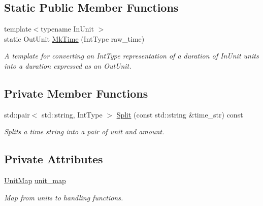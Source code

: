 \subsection*{Static Public Member Functions}
\begin{DoxyCompactItemize}
\item 
{\footnotesize template$<$typename In\+Unit $>$ }\\static Out\+Unit \hyperlink{classTimeParser_af0e270392bd5313b1d60e66e35dbfe82}{Mk\+Time} (Int\+Type raw\+\_\+time)
\begin{DoxyCompactList}\small\item\em A template for converting an Int\+Type representation of a duration of In\+Unit units into a duration expressed as an Out\+Unit. \end{DoxyCompactList}\end{DoxyCompactItemize}
\subsection*{Private Member Functions}
\begin{DoxyCompactItemize}
\item 
std\+::pair$<$ std\+::string, Int\+Type $>$ \hyperlink{classTimeParser_a3f7f36a669233d66e7fe1ca8405eefd5}{Split} (const std\+::string \&time\+\_\+str) const 
\begin{DoxyCompactList}\small\item\em Splits a time string into a pair of unit and amount. \end{DoxyCompactList}\end{DoxyCompactItemize}
\subsection*{Private Attributes}
\begin{DoxyCompactItemize}
\item 
\hypertarget{classTimeParser_a98bb2b31f6ad5210139bc87ef7ad0121}{\hyperlink{classTimeParser_adc32afc638ace5060a2134f8f74d3c60}{Unit\+Map} \hyperlink{classTimeParser_a98bb2b31f6ad5210139bc87ef7ad0121}{unit\+\_\+map}}\label{classTimeParser_a98bb2b31f6ad5210139bc87ef7ad0121}

\begin{DoxyCompactList}\small\item\em Map from units to handling functions. \end{DoxyCompactList}\end{DoxyCompactItemize}


